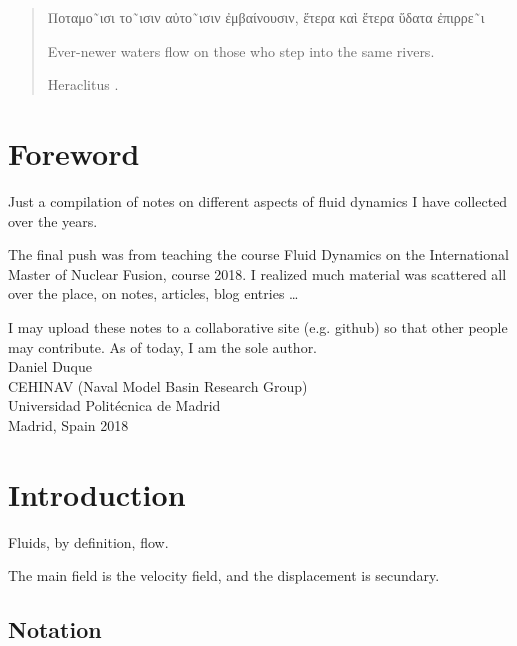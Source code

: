\chapter*{}

\vspace{6ex}
\begin{quote}
  \greektext

  Ποταμο˜ισι το˜ισιν αὐτο˜ισιν ἐμβαίνουσιν, ἕτερα καὶ ἕτερα ὕδατα ἐπιρρε˜ι  \\%
  \latintext
  \begin{em}
    Ever-newer waters flow on those who step into the same rivers.  \\%
  \end{em}
  Heraclitus \cite{Diels-Kranz}.%
\end{quote}


\newpage

\chapter*{Foreword}


Just a compilation of notes on different aspects of fluid
dynamics I have collected over the years.

The final push was from teaching the course Fluid Dynamics on the
International Master of Nuclear Fusion, course 2018. I realized much
material was scattered all over the place, on notes, articles, blog
entries \ldots

I may upload these notes to a collaborative site (e.g. github) so that
other people may contribute. As of today, I am the sole author.\\[4cm]

Daniel Duque \\
CEHINAV (Naval Model Basin Research Group) \\
Universidad Polit\'ecnica de Madrid \\
Madrid, Spain 2018


\chapter{Introduction}

Fluids, by definition, flow.

The main field is the velocity field, and the displacement is
secundary.


\section{Notation}


